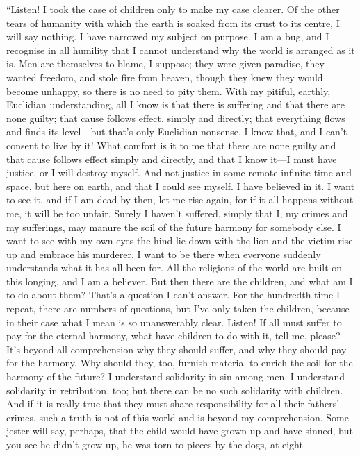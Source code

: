 ``Listen! I took the case of children only to make my case clearer. Of
the other tears of humanity with which the earth is soaked from its
crust to its centre, I will say nothing. I have narrowed my subject on
purpose. I am a bug, and I recognise in all humility that I cannot
understand why the world is arranged as it is. Men are themselves to
blame, I suppose; they were given paradise, they wanted freedom, and
stole fire from heaven, though they knew they would become unhappy, so
there is no need to pity them. With my pitiful, earthly, Euclidian
understanding, all I know is that there is suffering and that there
are none guilty; that cause follows effect, simply and directly; that
everything flows and finds its lev\-el---but that's only Euclidian
nonsense, I know that, and I can't consent to live by it! What comfort
is it to me that there are none guilty and that cause follows effect
simply and directly, and that I know it---I must have justice, or I
will destroy myself. And not justice in some remote infinite time and
space, but here on earth, and that I could see myself. I have believed
in it. I want to see it, and if I am dead by then, let me rise again,
for if it all happens without me, it will be too unfair. Surely I
haven't suffered, simply that I, my crimes and my sufferings, may
manure the soil of the future  harmony for somebody else. I
want to see with my own eyes the hind lie down with the lion and the
victim rise up and embrace his murderer. I want to be there when
everyone suddenly understands what it has all been for. All the
religions of the world are built on this longing, and I am a believer.
But then there are the children, and what am I to do about them?
That's a question I can't answer. For the hundredth time I repeat,
there are numbers of questions, but I've only taken the children,
because in their case what I mean is so unanswerably clear. Listen! If
all must suffer to pay for the eternal harmony, what have children to
do with it, tell me, please? It's beyond all comprehension why they
should suffer, and why they should pay for the harmony. Why should
they, too, furnish material to enrich the soil for the harmony of the
future? I understand solidarity in sin among men. I understand
solidarity in retribution, too; but there can be no such solidarity
with children. And if it is really true that they must share
responsibility for all their fathers' crimes, such a truth is not of
this world and is beyond my comprehension. Some jester will say,
perhaps, that the child would have grown up and have sinned, but you
see he didn't grow up, he was torn to pieces by the dogs, at eight
